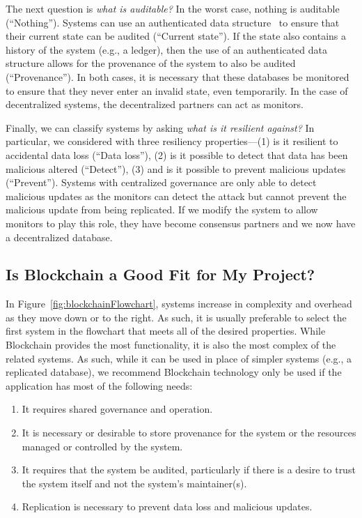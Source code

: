 The next question is \emph{what is auditable?}
In the worst case, nothing is auditable (``Nothing'').
Systems can use an authenticated data structure~\cite{tamassia2003authenticated} to ensure that their current state can be audited (``Current state'').
If the state also contains a history of the system (e.g., a ledger), then the use of an authenticated data structure allows for the provenance of the system to also be audited (``Provenance'').
In both cases, it is necessary that these databases be monitored to ensure that they never enter an invalid state, even temporarily.
In the case of decentralized systems, the decentralized partners can act as monitors.

Finally, we can classify systems by asking \emph{what is it resilient against?}
In particular, we considered with three resiliency properties---(1) is it resilient to accidental data loss (``Data loss''), (2) is it possible to detect that data has been malicious altered (``Detect''), (3) and is it possible to prevent malicious updates (``Prevent'').
Systems with centralized governance are only able to detect malicious updates as the monitors can detect the attack but cannot prevent the malicious update from being replicated.
If we modify the system to allow monitors to play this role, they have become consensus partners and we now have a decentralized database.

\subsection{Is Blockchain a Good Fit for My Project?}
\label{sec:should-i-use-it}
In Figure~\ref{fig:blockchainFlowchart}, systems increase in complexity and overhead as they move down or to the right.
As such, it is usually preferable to select the first system in the flowchart that meets all of the desired properties.
While Blockchain provides the most functionality, it is also the most complex of the related systems.
As such, while it can be used in place of simpler systems (e.g., a replicated database), we recommend Blockchain technology only be used if the application has most of the following needs:

\begin{enumerate}
	\item It requires shared governance and operation.
	\item It is necessary or desirable to store provenance for the system or the resources managed or controlled by the system.
	\item It requires that the system be audited, particularly if there is a desire to trust the system itself and not the system's maintainer(s).
	\item Replication is necessary to prevent data loss and malicious updates.
\end{enumerate}

